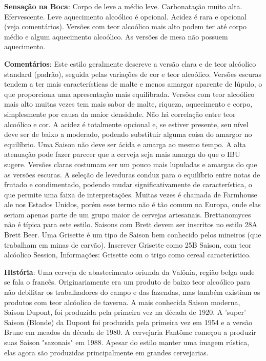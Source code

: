 \textbf{Sensação na Boca}: Corpo de leve a médio leve. Carbonatação muito alta. Efervescente. Leve aquecimento alcoólico é opcional. Acidez é rara e opcional (veja comentários). Versões com teor alcoólico mais alto podem ter até corpo médio e algum aquecimento alcoólico. As versões de mesa não possuem aquecimento.

\textbf{Comentários}: Este estilo geralmente descreve a versão clara e de teor alcóolico standard (padrão), seguida pelas variações de cor e teor alcoólico. Versões escuras tendem a ter mais características de malte e menos amargor aparente de lúpulo, o que proporciona uma apresentação mais equilibrada. Versões com teor alcoólico mais alto muitas vezes tem mais sabor de malte, riqueza, aquecimento e corpo, simplesmente por causa da maior densidade. Não há correlação entre teor alcoólico e cor. A acidez é totalmente opcional e, se estiver presente, seu nível deve ser de baixo a moderado, podendo substituir alguma coisa do amargor no equilíbrio. Uma Saison não deve ser ácida e amarga ao mesmo tempo. A alta atenuação pode fazer parecer que a cerveja seja mais amarga do que o IBU sugere. Versões claras costumam ser um pouco mais lupuladas e amargas do que as versões escuras. A seleção de leveduras conduz para o equilíbrio entre notas de frutado e condimentado, podendo mudar significativamente de característica, o que permite uma faixa de interpretações. Muitas vezes é chamada de Farmhouse ale nos Estados Unidos, porém esse termo não é tão comum na Europa, onde elas seriam apenas parte de um grupo maior de cervejas artesanais. Brettanomyces não é típica para este estilo. Saisons com Brett devem ser inscritos no estilo 28A Brett Beer. Uma Grisette é um tipo de Saison bem conhecido pelos mineiros (que trabalham em minas de carvão). Inscrever Grisette como 25B Saison, com teor alcóolico Session, Informações: Grisette com o trigo como cereal característico.

\textbf{História}: Uma cerveja de abastecimento oriunda da Valônia, região belga onde se fala o francês. Originariamente era um produto de baixo teor alcoólico para não debilitar os trabalhadores do campo e das fazendas, mas também existiam os produtos com teor alcóolico de taverna. A mais conhecida Saison moderna, Saison Dupont, foi produzida pela primeira vez na década de 1920. A 'super' Saison (Blonde) da Dupont foi produzida pela primeira vez em 1954 e a versão Brune em meados da década de 1980. A cervejaria Fantôme começou a produzir suas Saison "sazonais" em 1988. Apesar do estilo manter uma imagem rústica, elas agora são produzidas principalmente em grandes cervejarias.

